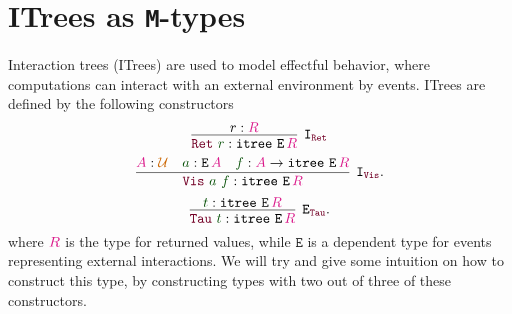 \documentclass[twoside,11pt,openright]{report}
\theoremstyle{plain} %
\theoremstyle{definition}
\theoremstyle{remark}
\newcommand*{\term}[1]{\textcolor{green!30!black}{#1}} %
\newcommand*{\type}[1]{\textcolor{magenta!90!black}{#1}}
\newcommand*{\universe}[1]{\textcolor{orange!80!black}{#1}}
\newcommand*{\constructor}[1]{\textcolor{purple!60!black}{\ensuremath{\mathtt{#1}}}}
\newcommand*{\typeformer}[1]{\ensuremath{\mathtt{#1}}}
\begin{document}
\section{ITrees as \texttt{M}-types}
Interaction trees (ITrees) \cite{DBLP:itrees} are used to model effectful behavior, where computations can interact with an external environment by events. ITrees are defined by the following constructors
\begin{equation}
  \vcenter{\infer[\mathtt{I}_{\constructor{Ret}}]{\constructor{Ret}~\term{r} : \typeformer{itree}~\typeformer{E}\,\type{R}}{r : \type{R}}}
\end{equation}
\begin{equation}
  \vcenter{\infer[\mathtt{I}_{\constructor{Vis}}]{\constructor{Vis}~\term{a}~\term{f} : \typeformer{itree}~\typeformer{E}\,\type{R}}{\type{A} : \universe{\mathcal{U}} & \term{a} : \typeformer{E}\,\type{A} & \term{f} : \type{A} \rightarrow \typeformer{itree}~\typeformer{E}\,\type{R}}}.
\end{equation}
\begin{equation}
  \vcenter{\infer[\mathtt{E}_{\constructor{Tau}}]{\constructor{Tau}~\term{t} : \typeformer{itree}~\typeformer{E}\,\type{R}}{\term{t} : \typeformer{itree}~\typeformer{E}\,\type{R}}}.
\end{equation}
where \(\type{R}\) is the type for returned values, while \(\typeformer{E}\) is a dependent type for events representing external interactions. We will try and give some intuition on how to construct this type, by constructing types with two out of three of these constructors.
\end{document}
